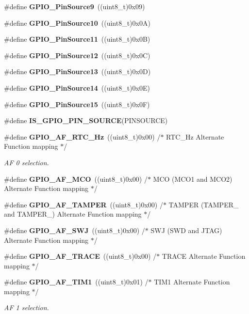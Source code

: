 \begin{DoxyCompactItemize}
\item 
\#define \textbf{ G\+P\+I\+O\+\_\+\+Pin\+Source9}~((uint8\+\_\+t)0x09)
\item 
\#define \textbf{ G\+P\+I\+O\+\_\+\+Pin\+Source10}~((uint8\+\_\+t)0x0\+A)
\item 
\#define \textbf{ G\+P\+I\+O\+\_\+\+Pin\+Source11}~((uint8\+\_\+t)0x0\+B)
\item 
\#define \textbf{ G\+P\+I\+O\+\_\+\+Pin\+Source12}~((uint8\+\_\+t)0x0\+C)
\item 
\#define \textbf{ G\+P\+I\+O\+\_\+\+Pin\+Source13}~((uint8\+\_\+t)0x0\+D)
\item 
\#define \textbf{ G\+P\+I\+O\+\_\+\+Pin\+Source14}~((uint8\+\_\+t)0x0\+E)
\item 
\#define \textbf{ G\+P\+I\+O\+\_\+\+Pin\+Source15}~((uint8\+\_\+t)0x0\+F)
\item 
\#define \textbf{ I\+S\+\_\+\+G\+P\+I\+O\+\_\+\+P\+I\+N\+\_\+\+S\+O\+U\+R\+CE}(P\+I\+N\+S\+O\+U\+R\+CE)
\item 
\#define \textbf{ G\+P\+I\+O\+\_\+\+A\+F\+\_\+\+R\+T\+C\+\_\+Hz}~((uint8\+\_\+t)0x00)  /$\ast$ R\+T\+C\+\_\+Hz Alternate Function mapping $\ast$/
\begin{DoxyCompactList}\small\item\em AF 0 selection. \end{DoxyCompactList}\item 
\#define \textbf{ G\+P\+I\+O\+\_\+\+A\+F\+\_\+\+M\+CO}~((uint8\+\_\+t)0x00)  /$\ast$ M\+C\+O (\+M\+C\+O1 and M\+C\+O2) Alternate Function mapping $\ast$/
\item 
\#define \textbf{ G\+P\+I\+O\+\_\+\+A\+F\+\_\+\+T\+A\+M\+P\+ER}~((uint8\+\_\+t)0x00)  /$\ast$ T\+A\+M\+P\+E\+R (\+T\+A\+M\+P\+E\+R\+\_ and T\+A\+M\+P\+E\+R\+\_) Alternate Function mapping $\ast$/
\item 
\#define \textbf{ G\+P\+I\+O\+\_\+\+A\+F\+\_\+\+S\+WJ}~((uint8\+\_\+t)0x00)  /$\ast$ S\+W\+J (\+S\+W\+D and J\+T\+A\+G) Alternate Function mapping $\ast$/
\item 
\#define \textbf{ G\+P\+I\+O\+\_\+\+A\+F\+\_\+\+T\+R\+A\+CE}~((uint8\+\_\+t)0x00)  /$\ast$ T\+R\+A\+C\+E Alternate Function mapping $\ast$/
\item 
\#define \textbf{ G\+P\+I\+O\+\_\+\+A\+F\+\_\+\+T\+I\+M1}~((uint8\+\_\+t)0x01)  /$\ast$ T\+I\+M1 Alternate Function mapping $\ast$/
\begin{DoxyCompactList}\small\item\em AF 1 selection. \end{DoxyCompactList}\item 

\end{DoxyCompactItemize}
